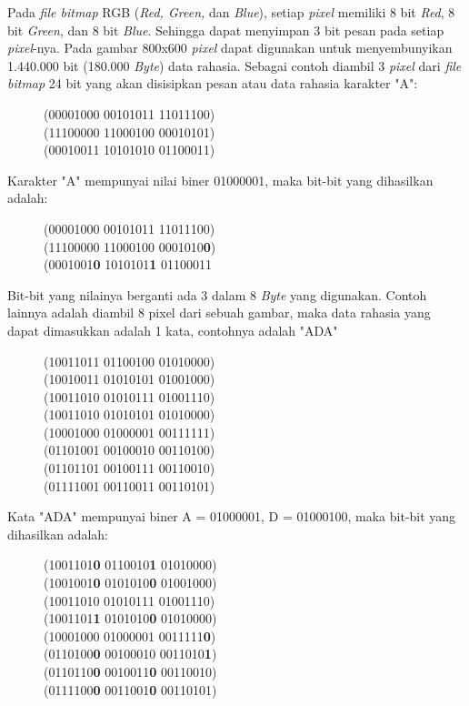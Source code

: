 Pada \emph{file bitmap} RGB (\emph{Red, Green,} dan \emph{Blue}), setiap \emph{pixel} memiliki 8 bit \emph{Red}, 8 bit \emph{Green}, dan 8 bit \emph{Blue}. Sehingga dapat menyimpan 3 bit pesan pada setiap \emph{pixel}-nya. Pada gambar 800x600 \emph{pixel} dapat digunakan untuk menyembunyikan 1.440.000 bit (180.000 \emph{Byte}) data rahasia. Sebagai contoh diambil 3 \emph{pixel} dari \emph{file bitmap} 24 bit yang akan disisipkan pesan atau data rahasia karakter "A":
\begin{figure}[H]
	\centering
	(00001000 00101011 11011100)\\
	(11100000 11000100 00010101)\\
	(00010011 10101010 01100011)\\
\end{figure}

Karakter "A" mempunyai nilai biner 01000001, maka bit-bit yang dihasilkan adalah:
\begin{figure}[H]
	\centering
	(00001000 00101011 11011100)\\
	(11100000 11000100 0001010\textbf{0})\\
	(0001001\textbf{0} 1010101\textbf{1} 01100011\\
\end{figure}

Bit-bit yang nilainya berganti ada 3 dalam 8 \emph{Byte} yang digunakan. Contoh lainnya adalah diambil 8 pixel dari sebuah gambar, maka data rahasia yang dapat dimasukkan adalah 1 kata, contohnya adalah "ADA"
\begin{figure}[H]
	\centering
	(10011011 01100100 01010000)\\
	(10010011 01010101 01001000)\\
	(10011010 01010111 01001110)\\
	(10011010 01010101 01010000)\\
	(10001000 01000001 00111111)\\
	(01101001 00100010 00110100)\\
	(01101101 00100111 00110010)\\
	(01111001 00110011 00110101)\\
\end{figure}

Kata "ADA" mempunyai biner A = 01000001, D = 01000100, maka bit-bit yang dihasilkan adalah:
\begin{figure}[H]
	\centering
	(1001101\textbf{0} 0110010\textbf{1} 01010000)\\
	(1001001\textbf{0} 0101010\textbf{0} 01001000)\\
	(10011010 01010111 01001110)\\
	(1001101\textbf{1} 0101010\textbf{0} 01010000)\\
	(10001000 01000001 0011111\textbf{0})\\
	(0110100\textbf{0} 00100010 0011010\textbf{1})\\
	(0110110\textbf{0} 0010011\textbf{0} 00110010)\\
	(0111100\textbf{0} 0011001\textbf{0} 00110101)\\
\end{figure}

